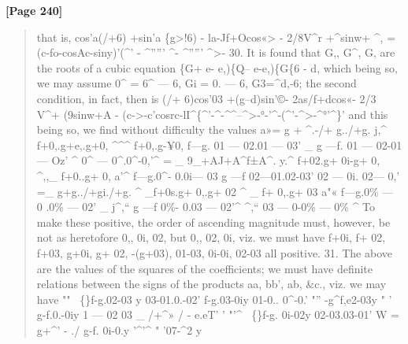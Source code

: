 \documentclass[11pt,a4paper]{book}
\begin{document}
\textbf{[Page 240]}\\[0.2cm]
\begin{quote}
that is,
cos'a(/+6) +sin'a \{g>!6) - la-Jf+Ocos«> - 2/8V\textasciicircum{}r +\textasciicircum{}sinw+ \textasciicircum{},
= (c-fo-cosAc-siny)'(\textasciicircum{}' - \textasciicircum{}''''' \textasciicircum{}- \textasciicircum{}''''' \textasciicircum{}>-
30. It is found that G,, G\textasciicircum{}, G, are the roots of a cubic equation
\{G+ e- e,)\{Q-- e-e,)\{G\{6 - d,
which being so, we may assume 0\textasciicircum{} = 6\textasciicircum{} --- 6, Gi = 0. --- 6, G3=\textasciicircum{}d,-6; the second condition,
in fact, then is
(/+ 6)cos'03 +(g--d)sin'©- 2as/f+dcos«- 2/3 V\textasciicircum{}+ (9sinw+A
-
(c->-c'cosrc-lI\textasciicircum{}\{\textasciicircum{}'-\textasciicircum{}-\textasciicircum{}\textasciicircum{}--\textasciicircum{}>-°-'\textasciicircum{}-(\textasciicircum{}'-\textasciicircum{}>-\textasciicircum{}°'\textasciicircum{}\}'
and this being so, we find without difficulty the values
a»= g + \textasciicircum{}.-/+ g../+g. j,\textasciicircum{} f+0,.g+e,.g+0, \textasciicircum{}\textasciicircum{}\textasciicircum{} f+0,.g-¥0,
f---g. 01 --- 02.01 --- 03' \_ g ---f. 01 --- 02-01 --- Oz' \textasciicircum{} 0\textasciicircum{} --- 0\textasciicircum{}.0\textasciicircum{}-0,'\textasciicircum{}
= \_ 9\_+AJ+A\textasciicircum{}f±A\textasciicircum{}. y.\textasciicircum{} f+02.g+ 0i-g+ 0, \textasciicircum{},,\_ f+0..g+ 0,
a'\textasciicircum{} f---g.0\textasciicircum{}- 0.0i--- 03 g ---f 02---01.02-03' 02 --- 0i. 02--- 0,'
=\_ g+g../+gi./+g. \textasciicircum{} \_f+0s.g+ 0,.g+ 02 \textasciicircum{} \_ f+ 0,.g+ 03
a"« f---g.0\% --- 0 .0\% --- 02' \_ j\textasciicircum{},`` g ---f 0\%- 0.03 --- 02'\textasciicircum{} \textasciicircum{},`` 03 --- 0-0\% --- 0\% \textasciicircum{}
To make these positive, the order of ascending magnitude must, however, be not as
heretofore 0,, 0i, 02, but 0,, 02, 0i, viz. we must have f+0i, f+ 02, f+03, g+0i,
g+ 02, -(g+03), 01-03, 0i-0i, 02-03 all positive.
31. The above are the values of the squares of the coefficients; we must have
definite relations between the signs of the products aa, bb', ab, \&c., viz. we may have
"" ~\{\}f-g.02-03 y 03-01.0.-02' f-g.03-0iy 01-0.. 0\textasciicircum{}-0.'
"'' -g\textasciicircum{}f,e2-03y " ' g-f.0.-0iy
1
---
02 03
\_ /+\textasciicircum{}» / - e.eT'
'
"'\textasciicircum{} ~\{\}f-g. 0i-02y 02-03.03-01'
W = g+\textasciicircum{}' - ./
g-f. 0i-0.y
'\textasciicircum{}'\textasciicircum{} " '07-\textasciicircum{}2 y
\end{quote}
\end{document}
